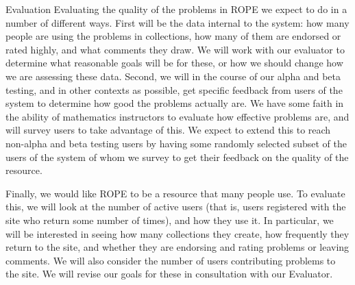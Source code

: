 \documentclass[11pt]{article}
\begin{document}
\begin{section}{Evaluation}
Evaluating the quality of the problems in ROPE we expect to do in a number
of different ways.  First will be the data internal to the system: how
many people are using the problems in collections, how many of them are
endorsed or rated highly, and what comments they draw.  We will work with
our evaluator to determine what reasonable goals will be for these, or how
we should change how we are assessing these data.  Second, we will in the
course of our alpha and beta testing, and in other contexts as possible,
get specific feedback from users of the system to determine how good the
problems actually are.  We have some faith in the ability of mathematics
instructors to evaluate how effective problems are, and will survey users
to take advantage of this.  We expect to extend this to reach non-alpha
and beta testing users by having some randomly selected subset of the
users of the system of whom we survey to get their feedback on the
quality of the resource.

Finally, we would like ROPE to be a resource that many people use.  To
evaluate this, we will look at the number of active users (that is, users
registered with the site who return some number of times), and how they
use it.  In particular, we will be interested in seeing how many
collections they create, how frequently they return to the site, and
whether they are endorsing and rating problems or leaving comments.  We
will also consider the number of users contributing problems to the site.
We will revise our goals for these in consultation with our Evaluator.



\end{section}
\end{document}
